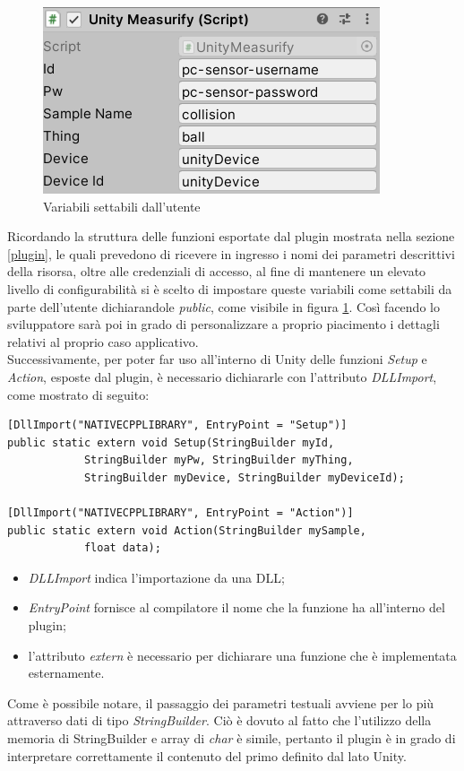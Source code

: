 \begin{figure}
	\centering
	\includegraphics[scale=0.85]{pics/unityscriptvars}
	\caption{Variabili settabili dall'utente}
	\label{unityscriptvars}
\end{figure}
Ricordando la struttura delle funzioni esportate dal plugin mostrata nella sezione \ref{plugin}, le quali prevedono di ricevere in ingresso i nomi dei parametri descrittivi della risorsa, oltre alle credenziali di accesso, al fine di mantenere un elevato livello di configurabilità si è scelto di impostare queste variabili come settabili da parte dell'utente dichiarandole \textit{public}, come visibile in figura \ref{unityscriptvars}. Così facendo lo sviluppatore sarà poi in grado di personalizzare a proprio piacimento i dettagli relativi al proprio caso applicativo.\\
Successivamente, per poter far uso all'interno di Unity delle funzioni \textit{Setup} e \textit{Action}, esposte dal plugin, è necessario dichiararle con l’attributo \textit{DLLImport}, come mostrato di seguito:
\begin{verbatim}
[DllImport("NATIVECPPLIBRARY", EntryPoint = "Setup")]
public static extern void Setup(StringBuilder myId, 
            StringBuilder myPw, StringBuilder myThing, 
            StringBuilder myDevice, StringBuilder myDeviceId);

[DllImport("NATIVECPPLIBRARY", EntryPoint = "Action")]
public static extern void Action(StringBuilder mySample, 
            float data);

\end{verbatim}

\begin{itemize}
	\item \textit{DLLImport} indica l'importazione da una DLL;
	\item \textit{EntryPoint} fornisce al compilatore il nome che la funzione ha all'interno del plugin;
	\item l'attributo \textit{extern} è necessario per dichiarare una funzione che è implementata esternamente.
\end{itemize}
Come è possibile notare, il passaggio dei parametri testuali avviene per lo più attraverso dati di tipo \textit{StringBuilder}. Ciò è dovuto al fatto che l’utilizzo della memoria di StringBuilder e array di \textit{char} è simile, pertanto il plugin è in grado di interpretare correttamente il contenuto del primo definito dal lato Unity. 




